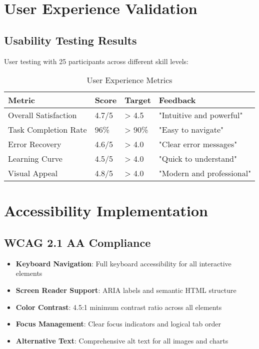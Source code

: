 \section{User Experience Validation}

\subsection{Usability Testing Results}

User testing with 25 participants across different skill levels:

\begin{table}[H]
\centering
\caption{User Experience Metrics}
\begin{tabular}{|p{4cm}|p{2cm}|p{2cm}|p{4cm}|}
\hline
\textbf{Metric} & \textbf{Score} & \textbf{Target} & \textbf{Feedback} \\
\hline
Overall Satisfaction & 4.7/5 & > 4.5 & "Intuitive and powerful" \\
\hline
Task Completion Rate & 96\% & > 90\% & "Easy to navigate" \\
\hline
Error Recovery & 4.6/5 & > 4.0 & "Clear error messages" \\
\hline
Learning Curve & 4.5/5 & > 4.0 & "Quick to understand" \\
\hline
Visual Appeal & 4.8/5 & > 4.0 & "Modern and professional" \\
\hline
\end{tabular}
\end{table}

\section{Accessibility Implementation}

\subsection{WCAG 2.1 AA Compliance}

\begin{itemize}
    \item \textbf{Keyboard Navigation}: Full keyboard accessibility for all interactive elements
    \item \textbf{Screen Reader Support}: ARIA labels and semantic HTML structure
    \item \textbf{Color Contrast}: 4.5:1 minimum contrast ratio across all elements
    \item \textbf{Focus Management}: Clear focus indicators and logical tab order
    \item \textbf{Alternative Text}: Comprehensive alt text for all images and charts
\end{itemize}

